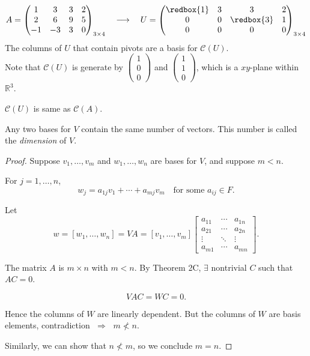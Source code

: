 \begin{eg}
    \[
    A = \begin{pmatrix}
        1 & 3 & 3 & 2 \\
        2 & 6 & 9 & 5 \\
        -1 & -3 & 3 & 0 \\
    \end{pmatrix}_{3 \times 4} \quad \longrightarrow \quad U = \begin{pmatrix}
        \redbox{1} & 3 & 3 & 2 \\
        0 & 0 & \redbox{3} & 1 \\
        0 & 0 & 0 & 0 \\
    \end{pmatrix}_{3 \times 4}
    \]
    The columns of $U$ that contain pivots are a basis for $\mathcal{C}(U)$. \\
    Note that $\mathcal{C}(U)$ is generate by $\begin{pmatrix}
        1 \\ 0 \\ 0
    \end{pmatrix}$ and $\begin{pmatrix}
        1 \\ 1 \\ 0
    \end{pmatrix}$, which is a $xy$-plane within $\mathbb{R}^3$.
    
    
\end{eg}

\begin{remark}
    $\mathcal{C}(U)$ is  same as $\mathcal{C}(A)$.
\end{remark}

\begin{theorem}[2J]
Any two bases for $V$ contain the same number of vectors. This number is called the \emph{dimension} of $V$.
\end{theorem}

\begin{proof}
Suppose $v_1, \dots, v_m$ and $w_1, \dots, w_n$ are bases for $V$, and suppose $m < n$.

For $j = 1, \dots, n$,
\[
w_j = a_{1j} v_1 + \cdots + a_{mj} v_m \quad \text{for some } a_{ij} \in F.
\]

Let
\[
w = [w_1, \dots, w_n] = V A = [v_1, \dots, v_m]
\begin{bmatrix}
a_{11} & \cdots & a_{1n} \\
a_{21} & \cdots & a_{2n} \\
\vdots & \ddots & \vdots \\
a_{m1} & \cdots & a_{mn}
\end{bmatrix}.
\]

The matrix $A$ is $m \times n$ with $m < n$.  
By Theorem 2C, $\exists$ nontrivial $C$ such that $A C = 0$.

\[
V A C = W C = 0.
\]

Hence the columns of $W$ are linearly dependent.  
But the columns of $W$ are basis elements, contradiction $\;\Rightarrow\;$ $m \not< n$.

Similarly, we can show that $n \not< m$,  
so we conclude $m = n$.
\end{proof}

